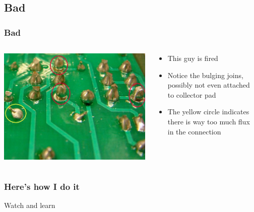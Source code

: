 \documentclass{beamer}
\begin{document}
\subsection{Bad}
\begin{frame}
  \frametitle{Bad}  
  \begin{columns}
    \begin{column}{5cm}
      \includegraphics[scale=0.25]{images/bad_joint.jpg}
    \end{column}
    \vspace{3cm}
    \begin{column}{5cm}
      \begin{itemize}
      \item This guy is fired
      \item Notice the bulging joins, possibly not even attached to
        collector pad
      \item The yellow circle indicates there is way too much flux in
        the connection
      \end{itemize}
    \end{column}
  \end{columns}  
\end{frame}

\begin{frame}
  \frametitle{Here's how I do it}
  Watch and learn
\end{frame}
\end{document}
